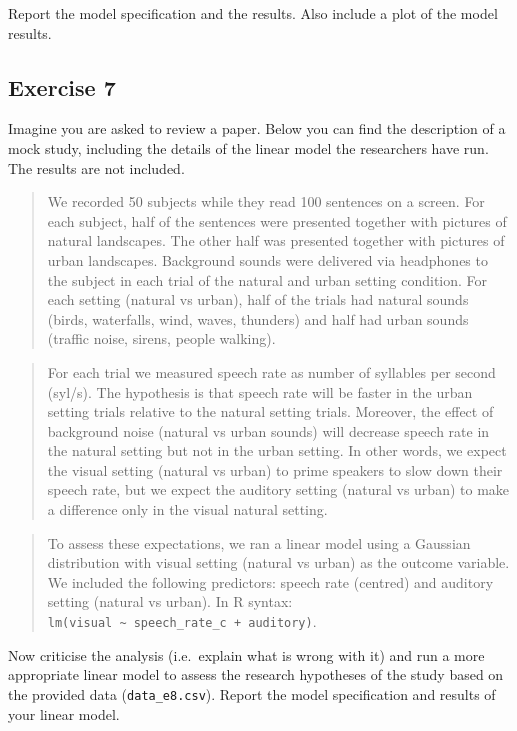 \documentclass[
]{article}
\begin{document}
Report the model specification and the results. Also include a plot of
the model results.

\hypertarget{exercise-7}{%
\subsection{Exercise 7}\label{exercise-7}}

Imagine you are asked to review a paper. Below you can find the
description of a mock study, including the details of the linear model
the researchers have run. The results are not included.

\begin{quote}
We recorded 50 subjects while they read 100 sentences on a screen. For
each subject, half of the sentences were presented together with
pictures of natural landscapes. The other half was presented together
with pictures of urban landscapes. Background sounds were delivered via
headphones to the subject in each trial of the natural and urban setting
condition. For each setting (natural vs urban), half of the trials had
natural sounds (birds, waterfalls, wind, waves, thunders) and half had
urban sounds (traffic noise, sirens, people walking).
\end{quote}

\begin{quote}
For each trial we measured speech rate as number of syllables per second
(syl/s). The hypothesis is that speech rate will be faster in the urban
setting trials relative to the natural setting trials. Moreover, the
effect of background noise (natural vs urban sounds) will decrease
speech rate in the natural setting but not in the urban setting. In
other words, we expect the visual setting (natural vs urban) to prime
speakers to slow down their speech rate, but we expect the auditory
setting (natural vs urban) to make a difference only in the visual
natural setting.
\end{quote}

\begin{quote}
To assess these expectations, we ran a linear model using a Gaussian
distribution with visual setting (natural vs urban) as the outcome
variable. We included the following predictors: speech rate (centred)
and auditory setting (natural vs urban). In R syntax:
\texttt{lm(visual\ \textasciitilde{}\ speech\_rate\_c\ +\ auditory)}.
\end{quote}

Now criticise the analysis (i.e.~explain what is wrong with it) and run
a more appropriate linear model to assess the research hypotheses of the
study based on the provided data (\texttt{data\_e8.csv}). Report the
model specification and results of your linear model.
\end{document}
